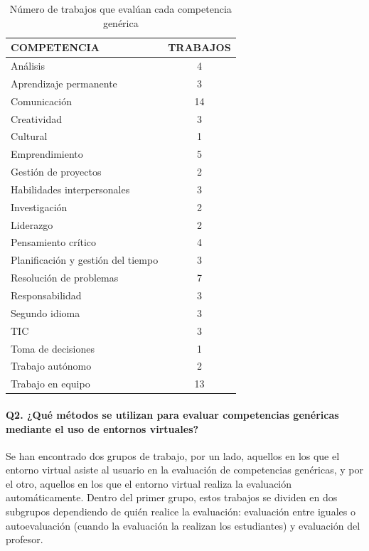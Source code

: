 \begin{table}
  \begin{center}
  \begin{tabular}{| m{10cm} | c |}
    \hline
    COMPETENCIA & TRABAJOS\\
    \hline
    \hline
    Análisis & 4\\
    \hline
    Aprendizaje permanente & 3\\
    \hline
    Comunicación & 14\\
    \hline
    Creatividad & 3\\
    \hline
    Cultural & 1\\
    \hline
    Emprendimiento & 5\\
    \hline
    Gestión de proyectos & 2\\
    \hline
    Habilidades interpersonales & 3\\
    \hline
    Investigación & 2\\
    \hline
    Liderazgo & 2\\
    \hline
    Pensamiento crítico & 4\\
    \hline
    Planificación y gestión del tiempo & 3\\
    \hline
    Resolución de problemas & 7\\
    \hline
    Responsabilidad & 3\\
    \hline 
    Segundo idioma & 3\\
    \hline
    TIC & 3\\
    \hline
    Toma de decisiones & 1\\
    \hline
    Trabajo autónomo & 2\\
    \hline
    Trabajo en equipo & 13\\
    \hline
  \end{tabular}
\end{center}
\caption{Número de trabajos que evalúan cada competencia genérica}
\label{tab:TrabajosCompetencia}
\end{table} 

\paragraph*{Q2. ¿Qué métodos se utilizan para evaluar competencias genéricas mediante el uso de entornos virtuales?}

Se han encontrado dos grupos de trabajo, por un lado, aquellos en los que el entorno virtual asiste al usuario en la evaluación de competencias genéricas, y por el otro, aquellos en los que el entorno virtual realiza la evaluación automáticamente. Dentro del primer grupo, estos trabajos se dividen en dos subgrupos dependiendo de quién realice la evaluación: evaluación entre iguales o autoevaluación (cuando la evaluación la realizan los estudiantes) y evaluación del profesor.

